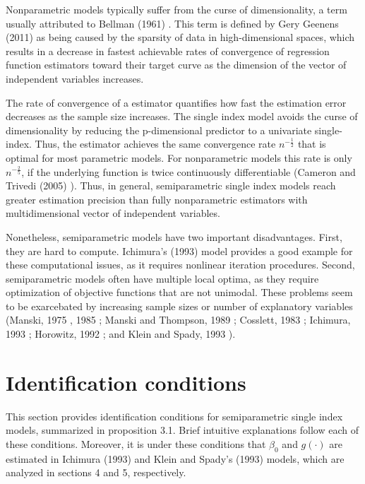 \documentclass[a4paper]{article}
\begin{document}
Nonparametric models typically suffer from the curse of dimensionality, a term usually attributed to Bellman (1961) \cite{[3]}. This term is defined by Gery Geenens (2011) \cite{[4]} as being caused by the sparsity of data in high-dimensional spaces, which results in a decrease in fastest achievable rates of convergence of regression function estimators toward their target curve as the dimension of the vector of independent variables increases. 

The rate of convergence of a estimator quantifies how fast the estimation error decreases as the sample size increases. The single index model avoids the curse of dimensionality by reducing the p-dimensional predictor to a univariate single-index. Thus, the estimator achieves the same convergence rate $n^{-\frac{1}{2}}$ that is optimal for most parametric models. For nonparametric models this rate is only $n^{-\frac{2}{5}}$, if the underlying function is twice continuously differentiable (Cameron and Trivedi (2005) \cite{[5]}).
Thus, in general, semiparametric single index models reach greater estimation precision than fully nonparametric estimators with multidimensional vector of independent variables.



Nonetheless, semiparametric models have two important disadvantages. First, they are hard to compute. Ichimura's (1993) \cite{[6]} model provides a good example for these computational issues, as it requires nonlinear iteration procedures. Second, semiparametric models often have multiple local optima, as they require optimization of objective functions that are not unimodal. These problems seem to be exarcebated by increasing sample sizes or number of explanatory variables (Manski, 1975 \cite{[7]}, 1985 \cite{[8]}; Manski and Thompson, 1989 \cite{[9]}; Cosslett, 1983 \cite{[10]}; Ichimura, 1993 \cite{[6]}; Horowitz, 1992 \cite{[11]}; and Klein and Spady, 1993 \cite{[12]} ).


\section{Identification conditions} %
\label{sec:Identification conditions}

This section provides identification conditions for semiparametric single index models,  summarized in proposition 3.1. Brief intuitive explanations follow each of these conditions. Moreover, it is under these conditions that $\beta_0$ and $ g(\cdot)$ are estimated in Ichimura (1993) \cite{[6]} and Klein and Spady's (1993) \cite{[12]} models, which are analyzed in sections 4 and 5, respectively.
\end{document}
